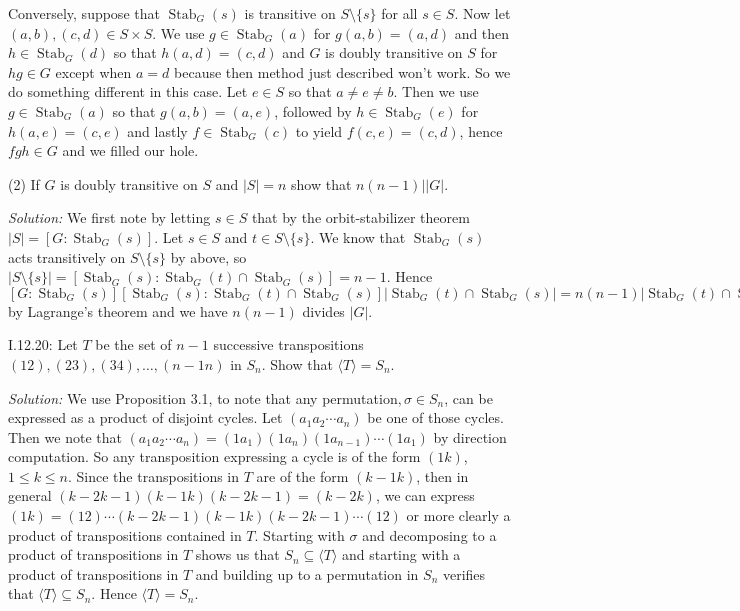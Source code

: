 \documentclass{letter}
\newcommand{\tmem}[1]{{\em #1\/}}
\newcommand{\tmop}[1]{\ensuremath{\operatorname{#1}}}
\begin{document}
Conversely, suppose that $\tmop{Stab}_G (s)$ is transitive on $S \setminus
\{s\}$ for all $s \in S$. Now let $(a, b), (c, d) \in S \times S$. We use $g
\in \tmop{Stab}_G (a)$ for $g (a, b) = (a, d)$ and then $h \in \tmop{Stab}_G
(d)$ so that $h (a, d) = (c, d)$ and $G$ is doubly transitive on $S$ for $h g
\in G$ except when $a = d$ because then method just described won't work. So
we do something different in this case. Let $e \in S$ so that $a \neq e \neq
b$. Then we use $g \in \tmop{Stab}_G (a)$ so that $g (a, b) = (a, e)$,
followed by $h \in \tmop{Stab}_G (e)$ for $h (a, e) = (c, e)$ and lastly $f
\in \tmop{Stab}_G (c)$ to yield $f (c, e) = (c, d)$, hence $f g h \in G$ and
we filled our hole.

(2) If $G$ is doubly transitive on $S$ and $|S| = n$ show that $n (n - 1) |
|G|$.

{\tmem{Solution:}} We first note by letting $s \in S$ that by the
orbit-stabilizer theorem $|S| = [G : \tmop{Stab}_G (s)]$. Let $s \in S$ and $t
\in S \setminus \{s\}$. We know that $\tmop{Stab}_G (s)$ acts transitively on
$S \setminus \{s\}$ by above, so $|S \setminus \{s\}| = [\tmop{Stab}_G (s) :
\tmop{Stab}_G (t) \cap \tmop{Stab}_G (s)] = n - 1$. Hence $[G : \tmop{Stab}_G
(s)] [\tmop{Stab}_G (s) : \tmop{Stab}_G (t) \cap \tmop{Stab}_G (s)] |
\tmop{Stab}_G (t) \cap \tmop{Stab}_G (s) | = n (n - 1) | \tmop{Stab}_G (t)
\cap \tmop{Stab}_G (s) | = |G|$ by Lagrange's theorem and we have $n (n - 1)$
divides $|G|$.

I.12.20: Let $T$ be the set of $n - 1$ successive transpositions $(12), (23),
(34), \ldots, (n - 1 n)$ in $S_n$. Show that $\langle T \rangle = S_n$.

{\tmem{Solution:}} We use Proposition 3.1, to note that any permutation$,
\sigma \in S_n$, can be expressed as a product of disjoint cycles. Let $(a_1
a_2 \cdots a_n)$ be one of those cycles. Then we note that $(a_1 a_2 \cdots
a_n) = (1 a_1) (1 a_n) (1 a_{n - 1}) \cdots (1 a_1)$ by direction computation.
So any transposition expressing a cycle is of the form $(1 k)$, $1 \leq k \leq
n$. Since the transpositions in $T$ are of the form $(k - 1 k)$, then in
general $(k - 2 k - 1) (k - 1 k) (k - 2 k - 1) = (k - 2 k)$, we can express
$(1 k) = (12) \cdots (k - 2 k - 1) (k - 1 k) (k - 2 k - 1) \cdots (12)$ or
more clearly a product of transpositions contained in $T$. Starting with
$\sigma$ and decomposing to a product of transpositions in $T$ shows us that
$S_n \subseteq \langle T \rangle$ and starting with a product of
transpositions in $T$ and building up to a permutation in $S_n$ verifies that
$\langle T \rangle \subseteq S_n$. Hence $\langle T \rangle = S_n$.
\end{document}
